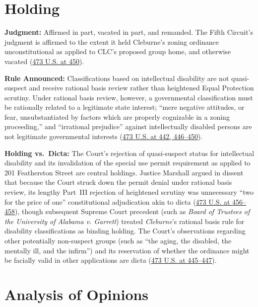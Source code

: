 \documentclass[12pt]{article}
\begin{document}
\section{Holding}

\textbf{Judgment:} Affirmed in part, vacated in part, and remanded. The Fifth Circuit's judgment is affirmed to the extent it held Cleburne's zoning ordinance unconstitutional as applied to CLC's proposed group home, and otherwise vacated (\href{https://supreme.justia.com/cases/federal/us/473/432/}{473 U.S. at 450}).

\textbf{Rule Announced:} Classifications based on intellectual disability are not quasi-suspect and receive rational basis review rather than heightened Equal Protection scrutiny. Under rational basis review, however, a governmental classification must be rationally related to a legitimate state interest; ``mere negative attitudes, or fear, unsubstantiated by factors which are properly cognizable in a zoning proceeding,'' and ``irrational prejudice'' against intellectually disabled persons are not legitimate governmental interests (\href{https://supreme.justia.com/cases/federal/us/473/432/}{473 U.S. at 442, 446--450}).

\textbf{Holding vs.\ Dicta:} The Court's rejection of quasi-suspect status for intellectual disability and its invalidation of the special use permit requirement as applied to 201 Featherston Street are central holdings. Justice Marshall argued in dissent that because the Court struck down the permit denial under rational basis review, its lengthy Part~III rejection of heightened scrutiny was unnecessary ``two for the price of one'' constitutional adjudication akin to dicta (\href{https://supreme.justia.com/cases/federal/us/473/432/}{473 U.S. at 456--458}), though subsequent Supreme Court precedent (such as \textit{Board of Trustees of the University of Alabama v. Garrett}) treated \textit{Cleburne}'s rational basis rule for disability classifications as binding holding. The Court's observations regarding other potentially non-suspect groups (such as ``the aging, the disabled, the mentally ill, and the infirm'') and its reservation of whether the ordinance might be facially valid in other applications are dicta (\href{https://supreme.justia.com/cases/federal/us/473/432/}{473 U.S. at 445--447}).

\section{Analysis of Opinions}
\end{document}
